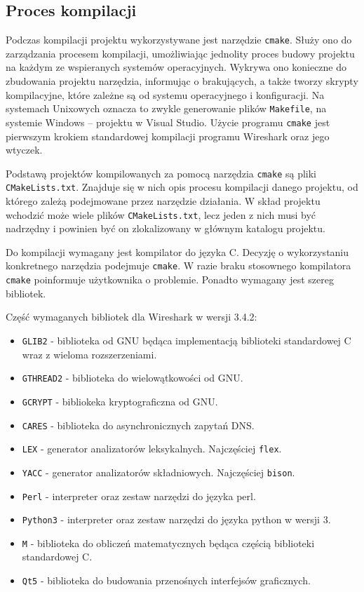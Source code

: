 \documentclass[a4paper, 11pt, twoside, openright]{article}
\begin{document}
	\subsection{Proces kompilacji}

	\indent\par
	Podczas kompilacji projektu wykorzystywane jest narzędzie \texttt{cmake}. Służy ono do zarządzania procesem kompilacji,
	umożliwiając jednolity proces budowy projektu
	na każdym ze wspieranych systemów operacyjnych. Wykrywa ono konieczne do zbudowania projektu narzędzia, informując
	o brakujących, a także tworzy skrypty kompilacyjne, które zależne są od systemu operacyjnego i konfiguracji. Na systemach Unixowych
	oznacza to zwykle generowanie plików \texttt{Makefile}, na systemie Windows -- projektu w Visual Studio. Użycie programu \texttt{cmake}
	jest pierwszym krokiem standardowej kompilacji programu Wireshark oraz jego wtyczek.

	Podstawą projektów kompilowanych za pomocą narzędzia \texttt{cmake} są pliki \\ \texttt{CMakeLists.txt}.
	Znajduje się w nich opis procesu kompilacji danego projektu, od którego zależą podejmowane przez narzędzie działania.
	W skład projektu wchodzić może wiele plików \texttt{CMakeLists.txt}, lecz jeden z nich musi być nadrzędny i powinien być
	on zlokalizowany w głównym katalogu projektu.

	Do kompilacji wymagany jest kompilator do języka C. Decyzję o wykorzystaniu konkretnego narzędzia podejmuje \texttt{cmake}.
	W razie braku stosownego kompilatora \texttt{cmake} poinformuje użytkownika o problemie. Ponadto wymagany jest szereg
	bibliotek.

	Część wymaganych bibliotek dla Wireshark w wersji 3.4.2:
	\begin{itemize}
		\item \texttt{GLIB2} - biblioteka od GNU będąca implementacją biblioteki standardowej C wraz z wieloma rozszerzeniami.
		\item \texttt{GTHREAD2} - biblioteka do wielowątkowości od GNU.
		\item \texttt{GCRYPT} - bibliokeka kryptograficzna od GNU.
		\item \texttt{CARES} - biblioteka do asynchronicznych zapytań DNS.
		\item \texttt{LEX} - generator analizatorów leksykalnych. Najczęściej \texttt{flex}.
		\item \texttt{YACC} - generator analizatorów składniowych. Najczęściej \texttt{bison}.
		\item \texttt{Perl} - interpreter oraz zestaw narzędzi do języka perl.
		\item \texttt{Python3} - interpreter oraz zestaw narzędzi do języka python w wersji 3.
		\item \texttt{M} - biblioteka do obliczeń matematycznych będąca częścią biblioteki standardowej C.
		\item \texttt{Qt5} - biblioteka do budowania przenośnych interfejsów graficznych.
	\end{itemize}
\end{document}
